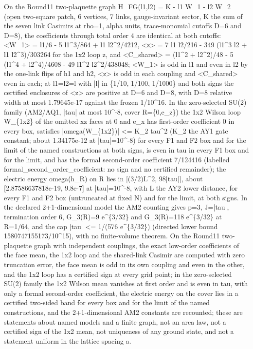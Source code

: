 \begin{gatequote}
On the Round11 two-plaquette graph H\_FG(l1,l2) = K - l1 W\_1 - l2 W\_2 (open
two-square patch, 6 vertices, 7 links, gauge-invariant sector, K the sum of
the seven link Casimirs at rho=1, alpha units, trace-monomial cutoffs D=6 and
D=8), the coefficients through total order 4 are identical at both cutoffs:
<W\_1> = l1/6 - 5 l1\textasciicircum{}3/864 + l1 l2\textasciicircum{}2/4212,
<z> = 7 l1 l2/216 - 349 (l1\textasciicircum{}3 l2 + l1
l2\textasciicircum{}3)/303264 for the 1x2 loop z, and <C\_shared> =
(l1\textasciicircum{}2 + l2\textasciicircum{}2)/48 - 5 (l1\textasciicircum{}4
+ l2\textasciicircum{}4)/4608 - 49 l1\textasciicircum{}2
l2\textasciicircum{}2/438048; <W\_1> is odd in l1 and even in l2 by the
one-link flips of h1 and h2, <z> is odd in each coupling and <C\_shared> even
in each; at l1=l2=l with |l| in \{1/10, 1/100, 1/1000\} and both signs the
certified enclosures of <z> are positive at D=6 and D=8, with D=8 relative
width at most 1.79645e-17 against the frozen 1/10\textasciicircum{}16. In the
zero-selected SU(2) family (AM2/AQ1, |tau| at most 10\textasciicircum{}-8,
cover R=\{0,e\_z\}) the 1x2 Wilson loop W\_\{1x2\} of the omitted xz faces at
0 and e\_x has first-order coefficient 0 in every box, satisfies
|omega(W\_\{1x2\})| <= K\_2\textquotesingle{} tau\textasciicircum{}2
(K\_2\textquotesingle{} the AY1 gate constant; about 1.34175e-12 at
|tau|=10\textasciicircum{}-8) for every F1 and F2 box and for the limit of the
named constructions at both signs, is even in tau in every F1 box and for the
limit, and has the formal second-order coefficient 7/124416 (labelled
formal\_second\_order\_coefficient: no sign and no certified remainder); the
electric energy omega(h\_R) on R lies in [(3/2)L\textasciicircum{}2, 98|tau|],
about [2.87586637818e-19, 9.8e-7] at |tau|=10\textasciicircum{}-8, with L the
AY2 lower distance, for every F1 and F2 box (untruncated at fixed N) and for
the limit, at both signs. In the declared 2+1-dimensional model the AM2
counting gives p=3, J=|tau|, termination order 6, G\_3(R)=9
e\textasciicircum{}\{3/32\} and G\_3\textquotesingle{}(R)=118
e\textasciicircum{}\{3/32\} at R=1/64, and the cap |tau| <= 1/(576
e\textasciicircum{}\{3/32\}) (directed lower bound
1580747155173/10\textasciicircum{}15), with no finite-volume theorem. On the
Round11 two-plaquette graph with independent couplings, the exact low-order
coefficients of the face mean, the 1x2 loop and the shared-link Casimir are
computed with zero truncation error, the face mean is odd in its own coupling
and even in the other, and the 1x2 loop has a certified sign at every grid
point; in the zero-selected SU(2) family the 1x2 Wilson mean vanishes at first
order and is even in tau, with only a formal second-order coefficient, the
electric energy on the cover lies in a certified two-sided band for every box
and for the limit of the named constructions, and the 2+1-dimensional AM2
constants are recounted; these are statements about named models and a finite
graph, not an area law, not a certified sign of the 1x2 mean, not uniqueness
of any ground state, and not a statement uniform in the lattice spacing a.
\end{gatequote}


